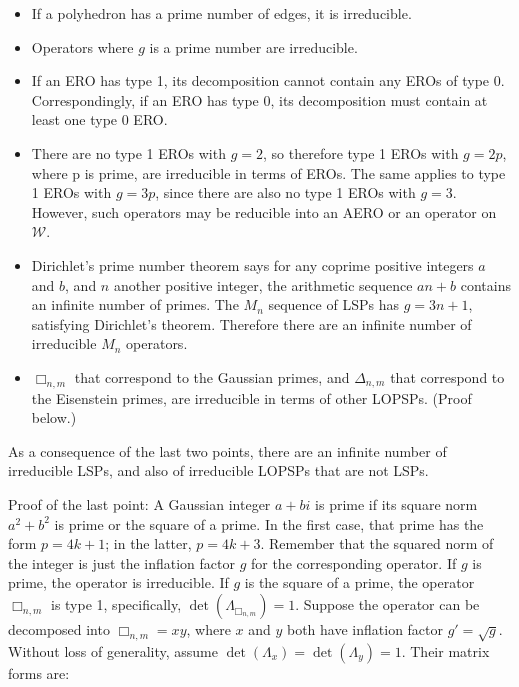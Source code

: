 \documentclass[12pt]{amsart}%
\begin{document}
\begin{itemize}
\item If a polyhedron has a prime number of edges, it is irreducible.
\item Operators where $g$ is a prime number are irreducible.
\item If an ERO has type 1, its decomposition cannot contain
any EROs of type 0. Correspondingly, if an ERO has type 0,
its decomposition must contain at least one type 0 ERO.
\item There are no type 1 EROs with $g=2$, so therefore type 1 EROs
  with $g=2p$, where p is prime, are irreducible in terms of EROs. The same
  applies to type 1 EROs with $g=3p$, since there are also no type 1 EROs with
  $g=3$. However, such operators may be reducible into an AERO or
  an operator on $\mathcal{W}$.
\item Dirichlet's prime number theorem says for any coprime positive integers
  $a$ and $b$, and $n$ another positive integer, the arithmetic sequence $an+b$
  contains an infinite number of primes.\cite{selberg} The $M_n$ sequence of
  LSPs has $g = 3n+1$, satisfying Dirichlet's theorem. Therefore there are an
  infinite number of irreducible $M_n$ operators.
\item $\Box_{n,m}$ that correspond to the Gaussian primes,
  and $\Delta_{n,m}$ that correspond to the Eisenstein primes,
  are irreducible in terms of other LOPSPs. (Proof below.)
\end{itemize}
As a consequence of the last two points, there are an infinite number of
irreducible LSPs, and also of irreducible LOPSPs that are not LSPs.

Proof of the last point: A Gaussian integer $a + bi$ is prime if its
square norm $a^2 + b^2$ is prime or the square of a prime. In the first
case, that prime has the form $p=4k+1$; in the latter, $p=4k+3$.
Remember that the squared norm of the integer is just the inflation factor $g$
for the corresponding operator. If $g$ is prime, the operator is irreducible.
If $g$ is the square of a prime, the operator $\Box_{n,m}$ is type 1,
specifically, $\det(\Lambda_{\Box_{n,m}}) = 1$. Suppose the operator can
be decomposed into $\Box_{n,m} = xy$, where $x$ and $y$ both have
inflation factor $g' = \sqrt{g}$. Without loss of generality, assume
$\det(\Lambda_x) = \det(\Lambda_y) = 1$. Their matrix forms are:
\end{document}
